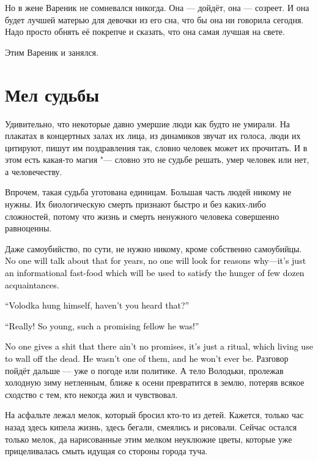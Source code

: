 \documentclass[a4paper,10pt,fleqn]{book}\usepackage{polyglossia}\setdefaultlanguage{english}\setotherlanguage{russian}\defaultfontfeatures{Ligatures=TeX,Mapping=tex-text} \usepackage{xcolor}\definecolor{lightgray}{HTML}{bbbbbb}\color{lightgray}\newcommand{\ml}[3]{\textcolor{black}{#3}}
\begin{document}
Но в жене Вареник не сомневался никогда.
Она --- дойдёт, она --- созреет.
И она будет лучшей матерью для девочки из его сна, что бы она ни говорила сегодня.
Надо просто обнять её покрепче и сказать, что она самая лучшая на свете.

Этим Вареник и занялся.

\section{Мел судьбы}

Удивительно, что некоторые давно умершие люди как будто не умирали.
На плакатах в концертных залах их лица, из динамиков звучат их голоса, люди их цитируют, пишут им поздравления так, словно человек может их прочитать.
И в этом есть какая-то магия "--- словно это не судьбе решать, умер человек или нет, а человечеству.

Впрочем, такая судьба уготована единицам.
Большая часть людей никому не нужны.
Их биологическую смерть признают быстро и без каких-либо сложностей, потому что жизнь и смерть ненужного человека совершенно равноценны.

Даже самоубийство, по сути, не нужно никому, кроме собственно самоубийцы.
\ml{$0$}
{О нём не будут говорить годами, никто не будет доискиваться причин, это будет информационный фастфуд, которым утолят свой голод пара десятков знакомых.}
{No one will talk about that for years, no one will look for reasons why---it's just an informational fast-food which will be used to satisfy the hunger of few dozen acquaintances.}

\ml{$0$}
{--- А Володька-то повесился, слышала?}
{``Volodka hung himself, haven't you heard that?''}

\ml{$0$}
{--- Да ты что!}
{``Really!}
\ml{$0$}
{Такой молодой, такие надежды подавал!}
{So young, such a promising fellow he was!''}

\ml{$0$}
{Всем уже совершенно неважно, что никаких надежд не было --- это просто ритуал, которым живые пытаются отгородиться от покойника.}
{No one gives a shit that there ain't no promises, it's just a ritual, which living use to wall off the dead.}
\ml{$0$}
{Он не был одним из них, и больше уже не будет.}
{He wasn't one of them, and he won't ever be.}
Разговор пойдёт дальше --- уже о погоде или политике.
А тело Володьки, пролежав холодную зиму нетленным, ближе к осени превратится в землю, потеряв всякое сходство с тем, кто некогда жил и чувствовал.

На асфальте лежал мелок, который бросил кто-то из детей.
Кажется, только час назад здесь кипела жизнь, здесь бегали, смеялись и рисовали.
Сейчас остался только мелок, да нарисованные этим мелком неуклюжие цветы, которые уже прицеливалась смыть идущая со стороны города туча.
\end{document}
